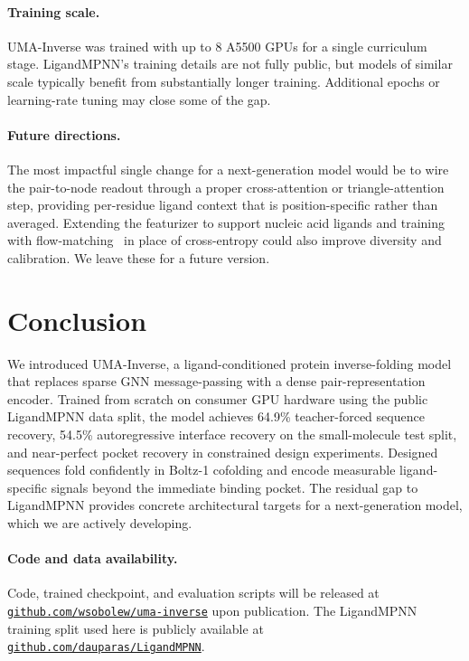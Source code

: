 \documentclass[11pt,letterpaper]{article}
\begin{document}
\paragraph{Training scale.}
UMA-Inverse was trained with up to 8 A5500 GPUs for a single curriculum stage. LigandMPNN's
training details are not fully public, but models of similar scale typically benefit from
substantially longer training. Additional epochs or learning-rate tuning may close some of the gap.

\paragraph{Future directions.}
The most impactful single change for a next-generation model would be to wire the pair-to-node
readout through a proper cross-attention or triangle-attention step, providing per-residue
ligand context that is position-specific rather than averaged. Extending the featurizer to support
nucleic acid ligands and training with flow-matching~\citep{lipman2022flow} in place of
cross-entropy could also improve diversity and calibration. We leave these for a future version.

\section{Conclusion}

We introduced UMA-Inverse, a ligand-conditioned protein inverse-folding model that replaces sparse
GNN message-passing with a dense pair-representation encoder. Trained from scratch on consumer
GPU hardware using the public LigandMPNN data split, the model achieves 64.9\% teacher-forced
sequence recovery, 54.5\% autoregressive interface recovery on the small-molecule test split, and
near-perfect pocket recovery in constrained design experiments. Designed sequences fold
confidently in Boltz-1 cofolding and encode measurable ligand-specific signals beyond the
immediate binding pocket. The residual gap to LigandMPNN provides concrete architectural targets
for a next-generation model, which we are actively developing.

\paragraph{Code and data availability.}
Code, trained checkpoint, and evaluation scripts will be released at
\href{https://github.com/wsobolew/uma-inverse}{\texttt{github.com/wsobolew/uma-inverse}}
upon publication. The LigandMPNN training split used here is publicly available at
\href{https://github.com/dauparas/LigandMPNN}{\texttt{github.com/dauparas/LigandMPNN}}.
\end{document}

